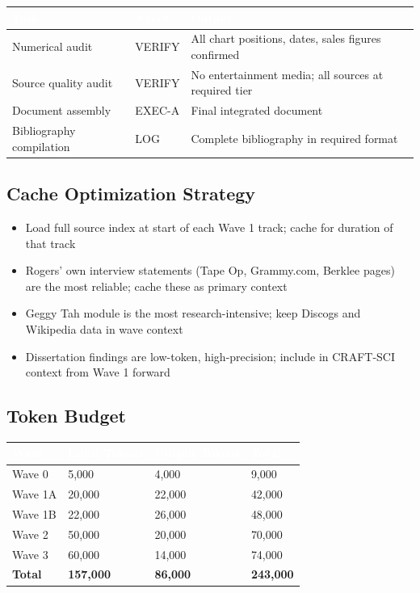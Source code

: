 \documentclass[11pt,letterpaper]{article}
\newcommand{\tableheader}[1]{\textbf{\sffamily\textcolor{white}{#1}}}
\begin{document}
\begin{center}
\begin{tabularx}{\textwidth}{L{4cm}L{3cm}X}
\toprule
{}
\tableheader{Task} & \tableheader{Agent} & \tableheader{Output} \\
\midrule
Numerical audit & VERIFY & All chart positions, dates, sales figures confirmed \\
Source quality audit & VERIFY & No entertainment media; all sources at required tier \\
Document assembly & EXEC-A & Final integrated document \\
Bibliography compilation & LOG & Complete bibliography in required format \\
\bottomrule
\end{tabularx}
\end{center}

\subsection{Cache Optimization Strategy}
\begin{itemize}[leftmargin=2em]
  \item Load full source index at start of each Wave 1 track; cache for duration of that track
  \item Rogers' own interview statements (Tape Op, Grammy.com, Berklee pages) are the most reliable; cache these as primary context
  \item Geggy Tah module is the most research-intensive; keep Discogs and Wikipedia data in wave context
  \item Dissertation findings are low-token, high-precision; include in CRAFT-SCI context from Wave 1 forward
\end{itemize}

\subsection{Token Budget}

\begin{center}
\begin{tabularx}{\textwidth}{L{4cm}C{2.5cm}C{2.5cm}C{2.5cm}}
\toprule
{}
\tableheader{Wave} & \tableheader{Input Tokens} & \tableheader{Output Tokens} & \tableheader{Total} \\
\midrule
Wave 0 & 5,000 & 4,000 & 9,000 \\
Wave 1A & 20,000 & 22,000 & 42,000 \\
Wave 1B & 22,000 & 26,000 & 48,000 \\
Wave 2 & 50,000 & 20,000 & 70,000 \\
Wave 3 & 60,000 & 14,000 & 74,000 \\
\midrule
{}
\textbf{Total} & \textbf{157,000} & \textbf{86,000} & \textbf{243,000} \\
\bottomrule
\end{tabularx}
\end{center}
\end{document}
